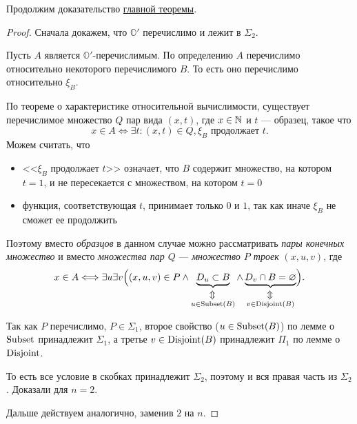 \noindent
Продолжим доказательство \hyperref[thm:main_thm]{главной теоремы}.
\begin{proof}\label{proof:main_thm}
	Сначала докажем, что $ \mathbb{O}'$ перечислимо и лежит в  $ \Sigma_2$.

	Пусть  $ A$ является $ \mathbb{O}'$-перечислимым. По определению $ A $ перечислимо относительно некоторого перечислимого $ B$. То есть оно перечислимо относительно  $ \xi_B$.

	По теореме о характеристике относительной вычислимости, существует перечислимое множество $ Q$ пар вида $ (x, t)$,  где $ x \in \mathbb{N}$ и $ t$ --- образец, такое что 
	\[
		x \in A \Longleftrightarrow \exists t \colon (x, t) \in Q, \xi_B \text{ продолжает } t
	.\] 
	Можем считать, что
	\begin{itemize}
		\item  <<$ \xi_B$ продолжает $ t$>> означает, что $ B$ содержит множество, на котором  $ t = 1$, и не пересекается с множеством, на котором  $ t = 0$
		\item функция, соответствующая $ t$, принимает только $ 0$ и $ 1$, так как иначе $ \xi_B$ не сможет ее продолжить
	\end{itemize}
	Поэтому вместо \textit{образцов} в данном случае можно рассматривать \textit{пары конечных множество} и вместо \textit{множества пар $ Q$} --- \textit{множество $ P$ троек} $ (x, u, v)$, где 
	\[
		x \in A \Longleftrightarrow \exists u \exists v \Bigl( (x, u,v) \in P \wedge
			\underbrace{D_u \subset B}_{\stackrel{\rotatebox[origin=c]{90}{$\Leftrightarrow$}}{u \in \Subsetm(B)}} \wedge 
		\underbrace{D_v \cap B = \varnothing}_{\stackrel{\rotatebox[origin=c]{90}{$\Leftrightarrow$}}{v \in  \Disjointm(B)}} \Bigr) 
	.\] 

	Так как $ P$ перечислимо,  $ P \in \Sigma_1$, второе свойство ($u \in  \operatorname{Subset}(B)$) по лемме о $ \operatorname{Subset}$ принадлежит  $ \Sigma_1$, а третье  $ v \in \operatorname{Disjoint}(B)$ принадлежит $ \Pi_1$ по лемме о \ $ \operatorname{Disjoint}$.

	То есть все условие в скобках принадлежит  $ \Sigma_2$, поэтому и вся правая часть из  $ \Sigma_2$.  Доказали для  $ n = 2$.
	
	Дальше действуем аналогично, заменив  $ 2$ на  $ n$.
\end{proof}

